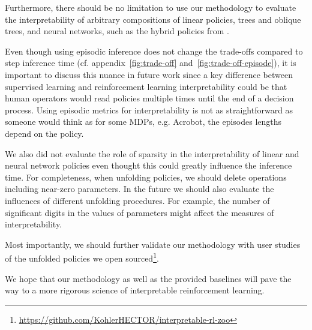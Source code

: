 Furthermore, there should be no limitation to use our methodology to evaluate the interpretability of arbitrary compositions of linear policies, trees and oblique trees, and neural networks, such as the hybrid policies from \cite{shindo2024blendrl}.

Even though using episodic inference does not change the trade-offs compared to step inference time (cf. appendix~\ref{fig:trade-off} and~\ref{fig:trade-off-episode}), it is important to discuss this nuance in future work since a key difference between supervised learning and reinforcement learning interpretability could be that human operators would read policies multiple times until the end of a decision process.
Using episodic metrics for interpretability is not as straightforward as someone would think as for some MDPs, e.g. Acrobot, the episodes lengths depend on the policy.

We also did not evaluate the role of sparsity in the interpretability of linear and neural network policies even thought this could greatly influence the inference time.
For completeness, when unfolding policies, we should delete operations including near-zero parameters. 
In the future we should also evaluate the influences of different unfolding procedures.
For example, the number of significant digits in the values of parameters might affect the measures of interpretability.

Most importantly, we should further validate our methodology with user studies of the unfolded policies we open sourced\footnote{\url{https://github.com/KohlerHECTOR/interpretable-rl-zoo}}.

We hope that our methodology as well as the provided baselines will pave the way to a more rigorous science of interpretable reinforcement learning.
